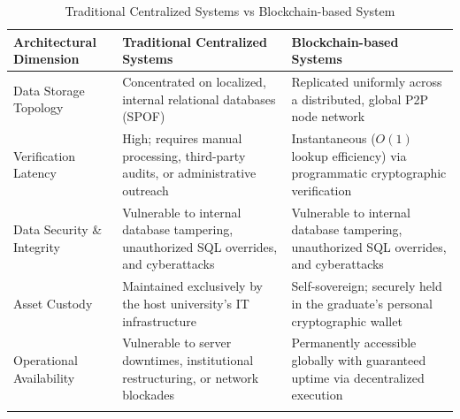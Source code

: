 \begin{longtable}{|m{3.5cm}|m{5cm}|m{5.5cm}|}
    \hline
    \textbf{Architectural Dimension} & \textbf{Traditional Centralized Systems} & \textbf{Blockchain-based Systems} \\
    \hline
    \endfirsthead
    
    Data Storage Topology & Concentrated on localized, internal relational databases (SPOF) & Replicated uniformly across a distributed, global P2P node network \\
    \hline
    
    Verification Latency & High; requires manual processing, third-party audits, or administrative outreach & Instantaneous ($O(1)$ lookup efficiency) via programmatic cryptographic verification \\
    \hline
    
    Data Security \& Integrity & Vulnerable to internal database tampering, unauthorized SQL overrides, and cyberattacks & Vulnerable to internal database tampering, unauthorized SQL overrides, and cyberattacks \\
    \hline

    Asset Custody & Maintained exclusively by the host university's IT infrastructure & Self-sovereign; securely held in the graduate's personal cryptographic wallet \\
    \hline

    Operational Availability & Vulnerable to server downtimes, institutional restructuring, or network blockades & Permanently accessible globally with guaranteed uptime via decentralized execution \\
    \hline

    \caption{Traditional Centralized Systems vs Blockchain-based System}
    \label{tab:compare_traditional_vs_blockchain}
\end{longtable}